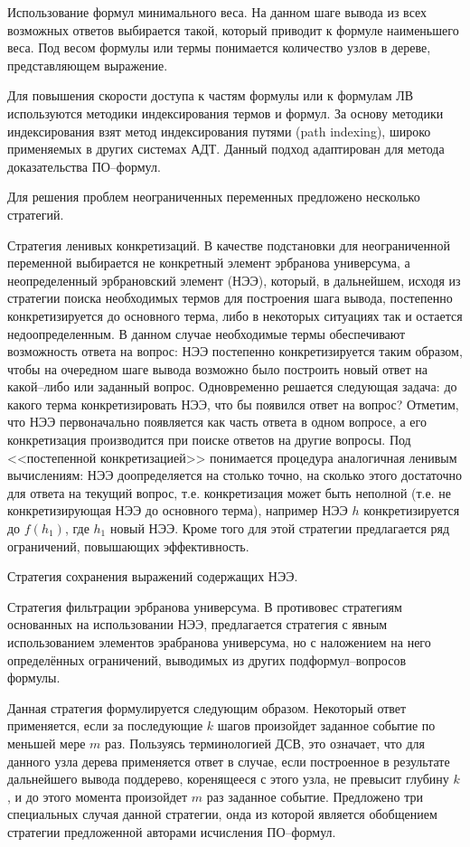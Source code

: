 \documentclass[a4paper]{report}
\begin{document}
Использование формул минимального веса. На данном шаге вывода из всех возможных ответов выбирается такой, который приводит к формуле наименьшего веса. Под весом формулы или термы понимается количество узлов в дереве, представляющем выражение.

Для повышения скорости доступа к частям формулы или к формулам ЛВ используются методики индексирования термов и формул. За основу методики индексирования взят метод индексирования путями (path indexing), широко применяемых в других системах АДТ. Данный подход адаптирован для метода доказательства ПО--формул.

Для решения проблем неограниченных переменных предложено несколько стратегий.

Стратегия ленивых конкретизаций. В качестве подстановки для неограниченной переменной выбирается не конкретный элемент эрбранова универсума, а неопределенный эрбрановский элемент (НЭЭ), который, в дальнейшем, исходя из стратегии поиска необходимых термов для построения шага вывода, постепенно конкретизируется до основного терма, либо в некоторых ситуациях так и остается недоопределенным. В данном случае необходимые термы обеспечивают возможность ответа на вопрос: НЭЭ постепенно конкретизируется таким образом, чтобы на очередном шаге вывода возможно было построить новый ответ на какой--либо или заданный вопрос. Одновременно решается следующая задача: до какого терма конкретизировать НЭЭ, что бы появился ответ на вопрос? Отметим, что НЭЭ первоначально появляется как часть ответа в одном вопросе, а его конкретизация производится при поиске ответов на другие вопросы. Под <<постепенной конкретизацией>> понимается процедура аналогичная ленивым вычислениям: НЭЭ доопределяется на столько точно, на сколько этого достаточно для ответа на текущий вопрос, т.е. конкретизация может быть неполной (т.е. не конкретизирующая НЭЭ до основного терма), например НЭЭ $h$ конкретизируется до $f(h_1)$, где $h_1$ новый НЭЭ. Кроме того для этой стратегии предлагается ряд ограничений, повышающих эффективность.

Стратегия сохранения выражений содержащих НЭЭ.

Стратегия фильтрации эрбранова универсума. В противовес стратегиям основанных на использовании НЭЭ, предлагается стратегия с явным использованием элементов эрабранова универсума, но с наложением на него определённых ограничений, выводимых из других подформул--вопросов формулы.

Данная стратегия формулируется следующим образом. Некоторый ответ применяется, если за последующие $k$ шагов произойдет заданное событие по меньшей мере $m$ раз. Пользуясь терминологией ДСВ, это означает, что для данного узла дерева применяется ответ в случае, если построенное в результате дальнейшего вывода поддерево, коренящееся с этого узла, не превысит глубину $k$, и до этого момента произойдет $m$ раз заданное событие. Предложено три специальных случая данной стратегии, онда из которой является обобщением стратегии предложенной авторами исчисления ПО--формул.
\end{document}
